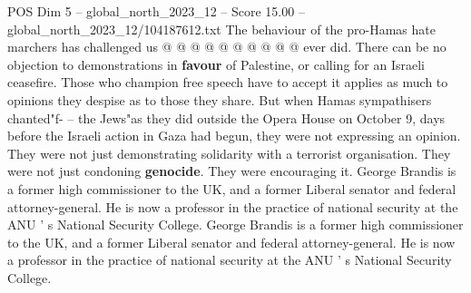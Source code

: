 \begin{textsample}{POS Dim 5 – global\_north\_2023\_12 – Score 15.00 – global\_north\_2023\_12/104187612.txt}
The behaviour of the pro-Hamas hate marchers has challenged us @ @ @ @ @ @ @ @ @ @ ever did.
There can be no objection to demonstrations in \textbf{favour} of Palestine, or calling for an Israeli ceasefire.
Those who champion free speech have to accept it applies as much to opinions they despise as to those they share.
But when Hamas sympathisers chanted"f- -- the Jews"as they did outside the Opera House on October 9, days before the Israeli action in Gaza had begun, they were not expressing an opinion.
They were not just demonstrating solidarity with a terrorist organisation.
They were not just condoning \textbf{genocide}.
They were encouraging it.
George Brandis is a former high commissioner to the UK, and a former Liberal senator and federal attorney-general.
He is now a professor in the practice of national security at the ANU ' s National Security College.
George Brandis is a former high commissioner to the UK, and a former Liberal senator and federal attorney-general.
He is now a professor in the practice of national security at the ANU ' s National Security College.

\end{textsample}
